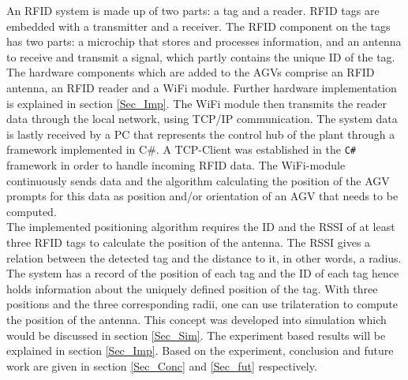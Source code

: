 An RFID system is made up of two parts: a tag and a reader. RFID tags are embedded with a transmitter and a receiver. The RFID component on the tags has two parts: a microchip that stores and processes information, and an antenna to receive and transmit a signal, which partly contains the unique ID of the tag. The hardware components which are added to the AGVs comprise an RFID antenna, an RFID reader and a WiFi module. Further hardware implementation is explained in section \ref{Sec_Imp}. The WiFi module then transmits the reader data through the local network, using TCP/IP communication. The system data is lastly received by a PC that represents the control hub of the plant through a framework implemented in C\#. A TCP-Client was established in the \texttt{C\#} framework in order to handle incoming RFID data. The WiFi-module continuously sends data and the algorithm calculating the position of the AGV prompts for this data as position and/or orientation of an AGV that needs to be computed.\\

The implemented positioning algorithm requires the ID and the RSSI of at least three RFID tags to calculate the position of the antenna. The RSSI gives a relation between the detected tag and the distance to it, in other words, a radius. The system has a record of the position of each tag and the ID of each tag hence holds information about the uniquely defined position of the tag. With three positions and the three corresponding radii, one can use trilateration to compute the position of the antenna. This concept was developed into simulation which would be discussed in section \ref{Sec_Sim}. The experiment based results will be explained in section \ref{Sec_Imp}. Based on the experiment, conclusion and future work are given in section \ref{Sec_Conc} and \ref{Sec_fut} respectively.





